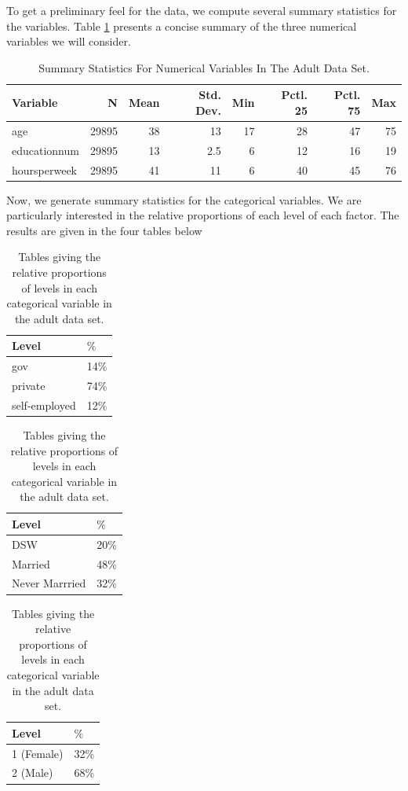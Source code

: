 \documentclass{article}
\begin{document}
	To get a preliminary feel for the data, we compute several summary statistics for the variables. Table \ref{fig:numVarsSummaryTab} presents a concise summary of the three numerical variables we will consider.
	\begin{table}[H] 
	\centering 
	\renewcommand*{\arraystretch}{1.1}
\begin{tabular}{lrrrrrrr}
\hline
\hline
Variable & N & Mean & Std. Dev. & Min & Pctl. 25 & Pctl. 75 & Max \\ 
\hline
age & 29895 & 38 & 13 & 17 & 28 & 47 & 75 \\ 
educationnum & 29895 & 13 & 2.5 & 6 & 12 & 16 & 19 \\ 
hoursperweek & 29895 & 41 & 11 & 6 & 40 & 45 & 76\\ 
\hline
\hline
\end{tabular}
\caption{Summary Statistics For Numerical Variables In The Adult Data Set.}
\label{fig:numVarsSummaryTab}

\end{table}

Now, we generate summary statistics for the categorical variables. We are particularly interested in the relative proportions of each level of each factor. The results are given in the four tables below
\begin{table}[H]
	\begin{subtable}[t]{0.33\textwidth}
		\centering 
		\begin{tabular}{ll}
			Level & $\%$ \\ 
			\midrule 
			gov & 14\% \\ 
			private & 74\% \\ 
			self-employed & 12\%
		\end{tabular}
		\caption{Levels of \texttt{workclass}}
		\label{tab:workclass}
	\end{subtable}
	\begin{subtable}[t]{0.33\textwidth}
		\centering
		\begin{tabular}{ll}
			Level & $\%$ \\ 
			\midrule 
			DSW & 20\% \\ 
			Married & 48\% \\ 
			Never Marrried & 32\%
		\end{tabular}
		\caption{Levels of \texttt{martialstatus}}
		\label{tab:martialstatus}
	\end{subtable}
	\begin{subtable}[t]{0.33\textwidth}
		\centering
		\begin{tabular}{ll}
			Level & $\%$ \\ 
			\midrule 
			1 (Female) & 32\% \\ 
			2 (Male) & 68\%
		\end{tabular}
		\caption{Levels of \texttt{sex}}
		\label{tab:martialstatus}
	\end{subtable}
	\caption{Tables giving the relative proportions of levels in each categorical variable in the adult data set. }
\end{table}
\end{document}
